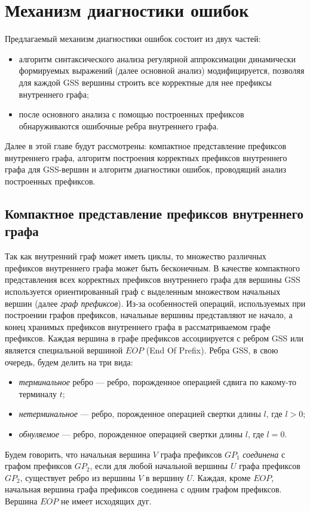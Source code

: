 \section{Механизм диагностики ошибок}
Предлагаемый механизм диагностики ошибок состоит из двух частей:
\begin{itemize}
    \item алгоритм синтаксического анализа регулярной аппроксимации динамически формируемых выражений (далее основной анализ) модифицируется, позволяя для каждой GSS вершины строить все корректные для нее префиксы внутреннего графа;
    \item после основного анализа с помощью построенных префиксов обнаруживаются ошибочные ребра внутреннего графа.
\end{itemize}
Далее в этой главе будут рассмотрены: компактное представление префиксов внутреннего графа, алгоритм построения корректных префиксов внутреннего графа для GSS-вершин и алгоритм диагностики ошибок, проводящий анализ построенных префиксов.

\subsection{Компактное представление префиксов внутреннего графа}
Так как внутренний граф может иметь циклы, то множество различных префиксов внутреннего графа может быть бесконечным. В качестве компактного представления всех корректных префиксов внутреннего графа для вершины GSS используется ориентированный граф с выделенным множеством начальных вершин (далее \emph{граф префиксов}). Из-за особенностей операций, используемых при построении графов префиксов, начальные вершины представляют не начало, а конец хранимых префиксов внутреннего графа в рассматриваемом графе префиксов. Каждая вершина в графе префиксов ассоциируется с ребром GSS или является специальной вершиной $EOP$ (End Of Prefix). Ребра GSS, в свою очередь, будем делить на три вида:
\begin{itemize}
    \item  \emph{терминальное} ребро --- ребро, порожденное операцией сдвига по какому-то терминалу $t$;
    \item \emph{нетерминальное} --- ребро, порожденное операцией свертки длины $l$, где $l > 0$;
    \item \emph{обнуляемое} --- ребро, порожденное операцией свертки длины $l$, где $l = 0$.
\end{itemize}
Будем говорить, что начальная вершина $V$ графа префиксов $GP_{1}$ \emph{соединена} с графом префиксов $GP_{2}$, если для любой начальной вершины $U$ графа префиксов $GP_{2}$, существует ребро из вершины $V$ в вершину $U$. Каждая, кроме $EOP$, начальная вершина графа префиксов соединена с одним графом префиксов. Вершина $EOP$ не имеет исходящих дуг.

